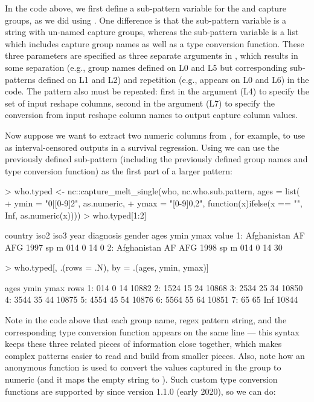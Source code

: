 In the code above, we first define a sub-pattern variable for the
 and  capture groups, as we did using
. One difference is that the  sub-pattern variable
is a string with un-named capture groups, whereas the 
sub-pattern variable is a list which includes capture group names as
well as a type conversion function. These three parameters are
specified as three separate arguments in , which results in
some separation (e.g., group names defined on L0 and L5 but corresponding
sub-patterns defined on L1 and L2) and repetition (e.g., 
appears on L0 and L6) in the code. The pattern also must be repeated:
first in the  argument (L4) to specify the set of input
reshape columns, second in the  argument (L7) to
specify the conversion from input reshape column names to output
capture column values.

Now suppose we want to extract two numeric columns from ,
for example, to use as interval-censored outputs in a survival
regression. Using  we can use the previously defined
sub-pattern (including the previously defined group names and type
conversion function) as the first part of a larger pattern:

\begin{Schunk}
\begin{Sinput}
> who.typed <- nc::capture_melt_single(who, nc.who.sub.pattern, ages = list(
+   ymin = "0|[0-9]{2}", as.numeric,
+   ymax = "[0-9]{0,2}", function(x)ifelse(x == "", Inf, as.numeric(x))))
> who.typed[1:2]
\end{Sinput}
\begin{Soutput}
       country iso2 iso3 year diagnosis gender ages ymin ymax value
1: Afghanistan   AF  AFG 1997        sp      m  014    0   14     0
2: Afghanistan   AF  AFG 1998        sp      m  014    0   14    30
\end{Soutput}
\begin{Sinput}
> who.typed[, .(rows = .N), by = .(ages, ymin, ymax)]
\end{Sinput}
\begin{Soutput}
   ages ymin ymax  rows
1:  014    0   14 10882
2: 1524   15   24 10868
3: 2534   25   34 10850
4: 3544   35   44 10875
5: 4554   45   54 10876
6: 5564   55   64 10851
7:   65   65  Inf 10844
\end{Soutput}
\end{Schunk}

Note in the code above that each group name, regex pattern string, and
the corresponding type conversion function appears on the same line ---
this syntax keeps these three related pieces of information close
together, which makes complex patterns easier to read and build from
smaller pieces. Also, note how an anonymous function is used to
convert the values captured in the  group to numeric (and
it maps the empty string to ). Such custom type conversion
functions are supported by  since version 1.1.0 (early
2020), so we can do:

